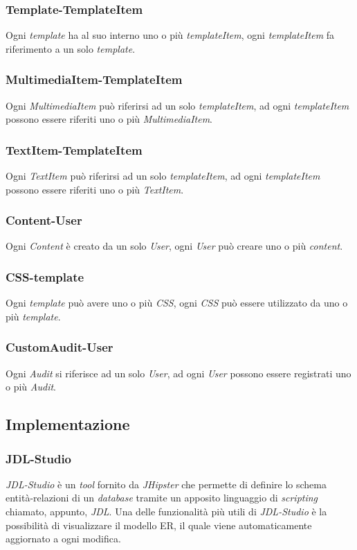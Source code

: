 \subsubsection{Template-TemplateItem}
Ogni \textit{template} ha al suo interno uno o più \textit{templateItem}, ogni \textit{templateItem} fa riferimento a un solo \textit{template}.
\subsubsection{MultimediaItem-TemplateItem}
Ogni \textit{MultimediaItem} può riferirsi ad un solo \textit{templateItem}, ad ogni \textit{templateItem} possono essere riferiti uno o più \textit{MultimediaItem}.
\subsubsection{TextItem-TemplateItem}
Ogni \textit{TextItem} può riferirsi ad un solo \textit{templateItem}, ad ogni \textit{templateItem} possono essere riferiti uno o più \textit{TextItem}.
\subsubsection{Content-User}
Ogni \textit{Content} è creato da un solo \textit{User}, ogni \textit{User} può creare uno o più \textit{content}.
\subsubsection{CSS-template}
Ogni \textit{template} può avere uno o più \textit{CSS}, ogni \textit{CSS} può essere utilizzato da uno o più \textit{template}.
\subsubsection{CustomAudit-User}
Ogni \textit{Audit} si riferisce ad un solo \textit{User}, ad ogni \textit{User} possono essere registrati uno o più \textit{Audit}.


\subsection{Implementazione}
\subsubsection{JDL-Studio}
\textit{JDL-Studio} è un \textit{tool} fornito da \textit{JHipster} che permette di definire lo schema entità-relazioni di un \textit{database} tramite un apposito linguaggio di \textit{scripting} chiamato, appunto, \textit{JDL}. Una delle funzionalità più utili di \textit{JDL-Studio} è la possibilità di visualizzare il modello ER, il quale viene automaticamente aggiornato a ogni modifica.
\newpage
